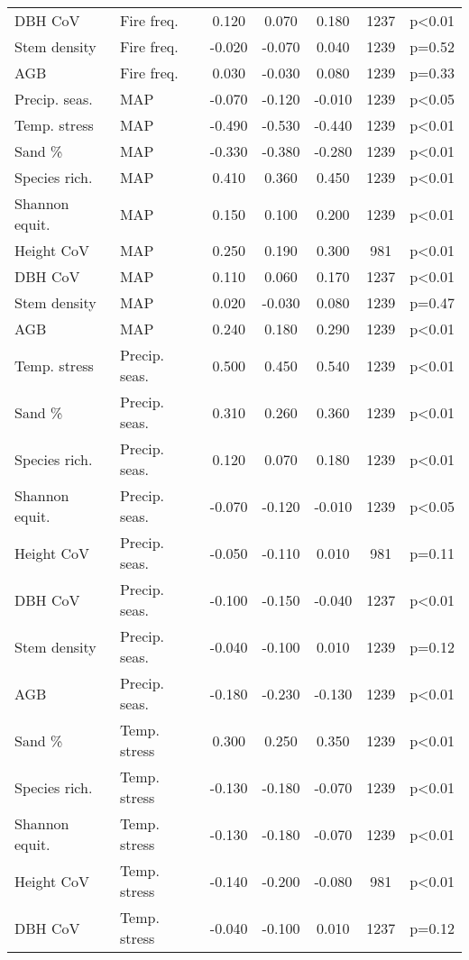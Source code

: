 \begin{longtable}{llSSSS[table-format=3.2,table-column-width=0.8cm]c}
DBH CoV & Fire freq. & 0.120 & 0.070 & 0.180 & 1237 & p<0.01 \\ 
Stem density & Fire freq. & -0.020 & -0.070 & 0.040 & 1239 & p=0.52 \\ 
AGB & Fire freq. & 0.030 & -0.030 & 0.080 & 1239 & p=0.33 \\ 
Precip. seas. & MAP & -0.070 & -0.120 & -0.010 & 1239 & p<0.05 \\ 
Temp. stress & MAP & -0.490 & -0.530 & -0.440 & 1239 & p<0.01 \\ 
Sand \% & MAP & -0.330 & -0.380 & -0.280 & 1239 & p<0.01 \\ 
Species rich. & MAP & 0.410 & 0.360 & 0.450 & 1239 & p<0.01 \\ 
Shannon equit. & MAP & 0.150 & 0.100 & 0.200 & 1239 & p<0.01 \\ 
Height CoV & MAP & 0.250 & 0.190 & 0.300 & 981 & p<0.01 \\ 
DBH CoV & MAP & 0.110 & 0.060 & 0.170 & 1237 & p<0.01 \\ 
Stem density & MAP & 0.020 & -0.030 & 0.080 & 1239 & p=0.47 \\ 
AGB & MAP & 0.240 & 0.180 & 0.290 & 1239 & p<0.01 \\ 
Temp. stress & Precip. seas. & 0.500 & 0.450 & 0.540 & 1239 & p<0.01 \\ 
Sand \% & Precip. seas. & 0.310 & 0.260 & 0.360 & 1239 & p<0.01 \\ 
Species rich. & Precip. seas. & 0.120 & 0.070 & 0.180 & 1239 & p<0.01 \\ 
Shannon equit. & Precip. seas. & -0.070 & -0.120 & -0.010 & 1239 & p<0.05 \\ 
Height CoV & Precip. seas. & -0.050 & -0.110 & 0.010 & 981 & p=0.11 \\ 
DBH CoV & Precip. seas. & -0.100 & -0.150 & -0.040 & 1237 & p<0.01 \\ 
Stem density & Precip. seas. & -0.040 & -0.100 & 0.010 & 1239 & p=0.12 \\ 
AGB & Precip. seas. & -0.180 & -0.230 & -0.130 & 1239 & p<0.01 \\ 
Sand \% & Temp. stress & 0.300 & 0.250 & 0.350 & 1239 & p<0.01 \\ 
Species rich. & Temp. stress & -0.130 & -0.180 & -0.070 & 1239 & p<0.01 \\ 
Shannon equit. & Temp. stress & -0.130 & -0.180 & -0.070 & 1239 & p<0.01 \\ 
Height CoV & Temp. stress & -0.140 & -0.200 & -0.080 & 981 & p<0.01 \\ 
DBH CoV & Temp. stress & -0.040 & -0.100 & 0.010 & 1237 & p=0.12 \\ 

\end{longtable}
